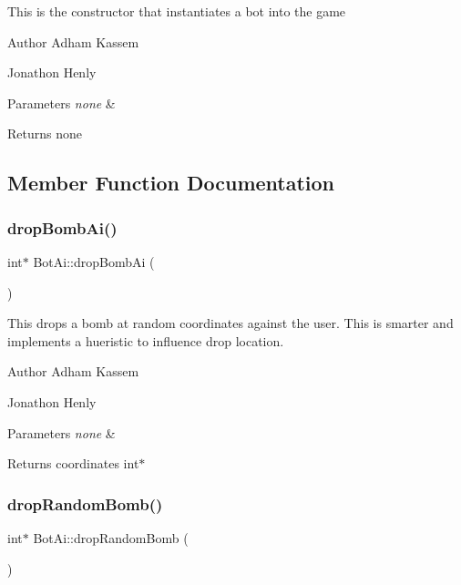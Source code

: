 This is the constructor that instantiates a bot into the game \begin{DoxyAuthor}{Author}
Adham Kassem 

Jonathon Henly 
\end{DoxyAuthor}

\begin{DoxyParams}{Parameters}
{\em none} & \\
\hline
\end{DoxyParams}
\begin{DoxyReturn}{Returns}
none 
\end{DoxyReturn}


\subsection{Member Function Documentation}
\mbox{\label{classBotAi_a3ec71cf63ede0307d303cda7d003051b}} 
\subsubsection{\texorpdfstring{drop\+Bomb\+Ai()}{dropBombAi()}}
{\footnotesize\ttfamily int$\ast$ Bot\+Ai\+::drop\+Bomb\+Ai (\begin{DoxyParamCaption}{ }\end{DoxyParamCaption})\hspace{0.3cm}{\ttfamily [inline]}}

This drops a bomb at random coordinates against the user. This is smarter and implements a hueristic to influence drop location. \begin{DoxyAuthor}{Author}
Adham Kassem 

Jonathon Henly 
\end{DoxyAuthor}

\begin{DoxyParams}{Parameters}
{\em none} & \\
\hline
\end{DoxyParams}
\begin{DoxyReturn}{Returns}
coordinates int$\ast$ 
\end{DoxyReturn}
\mbox{\label{classBotAi_a27834ee25890a2c462fcd3d318ca976f}} 
\subsubsection{\texorpdfstring{drop\+Random\+Bomb()}{dropRandomBomb()}}
{\footnotesize\ttfamily int$\ast$ Bot\+Ai\+::drop\+Random\+Bomb (\begin{DoxyParamCaption}{ }\end{DoxyParamCaption})\hspace{0.3cm}{\ttfamily [inline]}}

